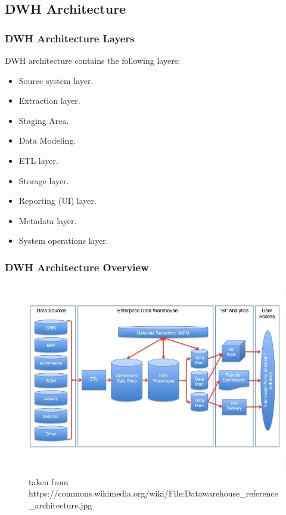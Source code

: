 \subsection{DWH Architecture}
\begin{frame}
    \frametitle{DWH Architecture Layers}

    \begin{wideitemize}
        \item DWH architecture contains the following layers:
        \begin{itemize}[<+->]
            \item Source system layer.
            \item Extraction layer.
            \item Staging Area.
            \item Data Modeling.
            \item ETL layer.
            \item Storage layer.
            \item Reporting (UI) layer.
            \item Metadata layer.
            \item System operations layer.
        \end{itemize}
    \end{wideitemize}

\end{frame}

\begin{frame}
    \frametitle{DWH Architecture Overview}
    \begin{figure}[ht]
        \centering
        \includegraphics[width=.9\linewidth,height=.8\textheight]{./Figures/chapter-01/Datawarehouse_reference_architecture.jpg}
                
        \caption{\tiny{taken from https://commons.wikimedia.org/wiki/File:Datawarehouse\_reference\_architecture.jpg}}
    \end{figure}
\end{frame}

